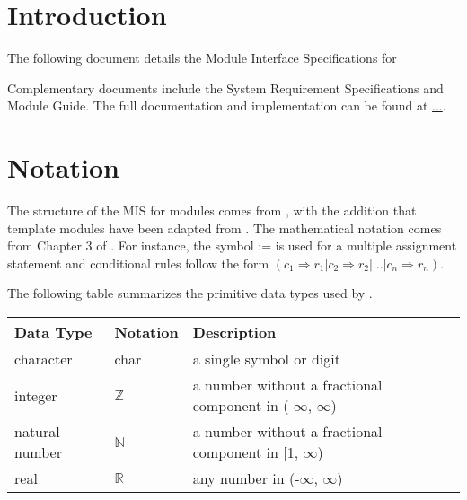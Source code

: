\documentclass[12pt, titlepage]{article}
\begin{document}
\tableofcontents

\newpage


\section{Introduction}

The following document details the Module Interface Specifications for

Complementary documents include the System Requirement Specifications
and Module Guide.  The full documentation and implementation can be
found at \url{...}.  

\section{Notation}


The structure of the MIS for modules comes from \citet{HoffmanAndStrooper1995},
with the addition that template modules have been adapted from
\cite{GhezziEtAl2003}.  The mathematical notation comes from Chapter 3 of
\citet{HoffmanAndStrooper1995}.  For instance, the symbol := is used for a
multiple assignment statement and conditional rules follow the form $(c_1
\Rightarrow r_1 | c_2 \Rightarrow r_2 | ... | c_n \Rightarrow r_n )$.

The following table summarizes the primitive data types used by \progname. 

\begin{center}
\renewcommand{\arraystretch}{1.2}
\noindent 
\begin{tabular}{l l p{7.5cm}} 
\toprule 
\textbf{Data Type} & \textbf{Notation} & \textbf{Description}\\ 
\midrule
character & char & a single symbol or digit\\
integer & $\mathbb{Z}$ & a number without a fractional component in (-$\infty$, $\infty$) \\
natural number & $\mathbb{N}$ & a number without a fractional component in [1, $\infty$) \\
real & $\mathbb{R}$ & any number in (-$\infty$, $\infty$)\\
\bottomrule
\end{tabular} 
\end{center}
\end{document}
